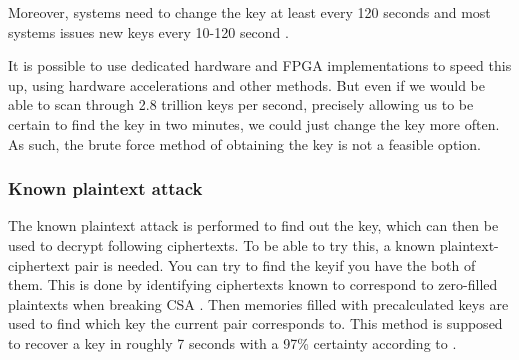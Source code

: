 Moreover, systems need to change the key at least every 120 seconds 
\citep{Simpson:2009} and most systems issues new keys every 10-120 
second \citep{Wirt:2004}.

It is possible to use dedicated hardware and FPGA implementations to 
speed this up, using hardware accelerations and other methods. But even 
if we would be able to scan through 2.8 trillion keys per second, 
precisely allowing us to be certain to find the key in two minutes, we 
could just change the key more often. As such, the brute force method 
of obtaining the key is not a feasible option.

\subsubsection{Known plaintext attack}\label{sec:kpa}
The known plaintext attack is performed to find out the key, which can 
then be used to decrypt following ciphertexts. To be able to try this, 
a known plaintext-ciphertext pair is needed. You can try to find the keyif you have the both of them. This is done by identifying ciphertexts 
known to correspond to zero-filled plaintexts when breaking CSA 
\citep{Breaking:2012}. Then memories filled with precalculated keys are 
used to find which key the current pair corresponds to. This method is 
supposed to recover a key in roughly 7 seconds with a 97\% certainty 
according to \citet{Breaking:2012}.

